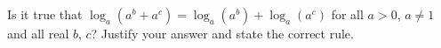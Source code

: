 Is it true that $\log_a\left(a^b+a^c\right)=\log_a\left(a^b\right)+\log_a\left(a^c\right)$ for all $a>0$, $a\ne1$ and all real $b$, $c$? Justify your answer and state the correct rule.
